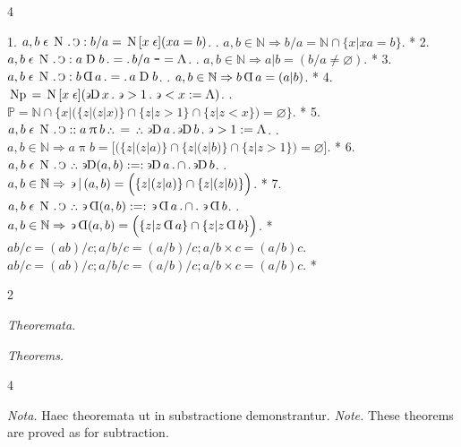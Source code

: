 \documentclass{book}
\newcommand{\s}{\switchcolumn} %
\newcommand{\C}{\mathop{\sbox0{$\displaystyle$$\reflectbox{C}$} %
\raisebox{-\height+\ht0-0.05cm}[\ht0][\dp0]{\scalebox{0.8}[0.8]{\copy0}}}\displaylimits} %
\newcommand{\p}{\mathop{\sbox0{$\displaystyle$$.$}
\raisebox{-\height+\ht0}[\ht0][\dp0]{\scalebox{1}[1]{\copy0}}}\displaylimits} %
\newcommand{\pppNoSpace}{\leavevmode\lower0ex\hbox{.}\kern-0.1em\raise0.7ex\hbox{.}\kern-0.1em\lower0ex\hbox{.}} %
\newcommand{\ppp}{\thinspace \pppNoSpace\thinspace} %
\newcommand{\no}{\mathop{\thinspace \scalebox{1.5}{-}}}
\newcommand{\abs}{\mathop{\rotatebox[origin=c]{180}{V}}}
\newcommand{\larger}{\mathrel{>}}
\newcommand{\smaller}{\mathrel{<}}
\newcommand{\such}{\thinspace \rotatebox[origin=c]{180}{$\epsilon$}}
\newcommand{\mult}{\mathop{\reflectbox{D}}}
\newcommand{\smallIn}{\ensuremath{\mathrel{\epsilon}}}
\newcommand{\primeWith}{\ensuremath{\mathbin{\uppi}}}
\newcommand{\divSet}{\mathop{\rotatebox[origin=c]{180}{$\epsilon$}\mkern-1mu\text{D}}}
\newcommand{\D}{\mathrel{\text{D}}}
\newcommand{\N}{\mathop{\thinspace \text{N} \thinspace}}
\newcommand{\Np}{\mathop{\thinspace \text{Np} \thinspace}}
\renewcommand{\rightarrow}{\Rightarrow}
\newcommand\peanoHeadingSmall[1]{ \vspace{0.75cm} \textit{#1} \nopagebreak[4]

\vspace{0.25cm} \nopagebreak[1]}
\newenvironment{translateTwoCol}
               { %
                 \columnratio{0.5, 0.5}
                 \begin{paracol}{2}
                 \newcommand{\LAT}{\switchcolumn[0]*}
                 \newcommand{\ENG}{\switchcolumn[1]}
               }
               { %
                 \let\ENG\undefined
                 \let\LAT\undefined
                 \end{paracol}
               }
\newenvironment{translateFourCol}[4]
               { %
                 \setcolumnwidth{#1\fill/1em, #2\fill/\columnsep, #3\fill/1em, #4\fill}
                 \begin{paracol}{4}
                 \newcommand{\LAT}{\switchcolumn[0]*}
                 \newcommand{\ENG}{\switchcolumn[2]}
               }
               { %
                 \let\ENG\undefined
                 \let\LAT\undefined
                 \end{paracol}
               }
\begin{document}
\begin{translateFourCol}{0.08}{0.42}{0.08}{0.42}  %
\raggedright
1. \s $a,b \smallIn \N \p \C : b / a = \N [x \smallIn] (xa=b)$.
\ENG
1. \s $a,b \in \mathbb{N} \rightarrow b / a = \mathbb{N} \cap \{x | xa=b \}$.
\LAT
2. \s $a,b \smallIn \N \p \C : a \D b \p = \p b / a \no = \abs$.
\ENG
2. \s $a,b \in \mathbb{N} \rightarrow a | b = (b / a \neq \varnothing)$.
\LAT
3. \s $a,b \smallIn \N \p \C : b \mult a \p = \p a \D b$.
\ENG
3. \s $a,b \in \mathbb{N} \rightarrow b \mult a = (a | b)$. \hfill %
\LAT
4. \s $\Np = \N [x \smallIn] (\divSet x \p \such \larger 1 \p \such \smaller x : = \abs)$.
\ENG
4. \s $\mathbb{P} = \mathbb{N} \cap \Big\{x \Big| \Big( \{ z | (z | x) \} \cap \{z | z > 1 \} \cap \{z | z < x \} \Big) = \varnothing \Big\}$.
\LAT
5. \s $a,b \smallIn \N \p \C :: a \primeWith b \ppp = \ppp \divSet a \p \divSet b \p \such \larger 1 : = \abs$.
\ENG
5. \s $a,b \in \mathbb{N} \rightarrow a \primeWith b = \Big[\Big(\{z | (z | a) \} \cap \{z | (z | b) \} \cap \{ z | z > 1 \} \Big) = \varnothing \Big]$.
\LAT
6. \s $a,b \smallIn \N \p \C \ppp \divSet (a,b) : = : \divSet a \p \cap \p \divSet b$.
\ENG
6. \s $a,b \in \mathbb{N} \rightarrow \such\,|\,(a,b) = \Big( \{ z | ( z | a) \} \cap \{ z | (z | b) \} \Big)$. \hfill %
\LAT
7. \s $a,b \smallIn \N \p \C \ppp \such \mult (a,b) : = : \such \mult a \p \cap \p \such \mult b$.
\ENG
7. \s $a,b \in \mathbb{N} \rightarrow \such \mult (a,b) = \Big( \{ z | z \mult a \} \cap \{z | z \mult b \} \Big)$. \hfill %
\LAT
\s $ab / c = (ab)/c; a/b/c = (a/b)/c; a/b \times c = (a/b)c$.
\ENG
\s $ab / c = (ab)/c; a/b/c = (a/b)/c; a/b \times c = (a/b)c$.
\LAT
\end{translateFourCol}

\begin{translateTwoCol}
\centering
{}
{}
\peanoHeadingSmall{Theoremata.}
\s
\peanoHeadingSmall{Theorems.}
\end{translateTwoCol}

\begin{translateFourCol}{0.1}{0.4}{0.1}{0.4}
\raggedright
\emph{Nota.} \s Haec theoremata ut in substractione demonstrantur.
\s
\emph{Note.} \s These theorems are proved as for subtraction.
\end{translateFourCol}
\end{document}
